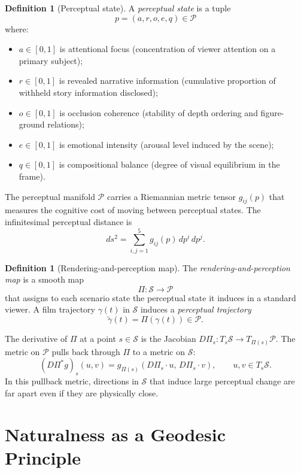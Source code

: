\documentclass[12pt,a4paper]{article}
\theoremstyle{plain}
\theoremstyle{definition}
\newtheorem{definition}[theorem]{Definition}
\begin{document}
\begin{definition}[Perceptual state]
A \emph{perceptual state} is a tuple
\[
p = (a, r, o, e, q) \in \mathcal{P}
\]
where:
\begin{itemize}[nosep]
\item $a \in [0,1]$ is attentional focus (concentration of viewer attention on a
primary subject);
\item $r \in [0,1]$ is revealed narrative information (cumulative proportion of
withheld story information disclosed);
\item $o \in [0,1]$ is occlusion coherence (stability of depth ordering and
figure-ground relations);
\item $e \in [0,1]$ is emotional intensity (arousal level induced by the scene);
\item $q \in [0,1]$ is compositional balance (degree of visual equilibrium in the
frame).
\end{itemize}
\end{definition}

The perceptual manifold $\mathcal{P}$ carries a Riemannian metric tensor
$g_{ij}(p)$ that measures the cognitive cost of moving between perceptual states.
The infinitesimal perceptual distance is
\[
ds^2 = \sum_{i,j=1}^{5} g_{ij}(p)\,dp^i\,dp^j.
\]

\begin{definition}[Rendering-and-perception map]
The \emph{rendering-and-perception map} is a smooth map
\[
\Pi: \mathcal{S} \to \mathcal{P}
\]
that assigns to each scenario state the perceptual state it induces in a
standard viewer. A film trajectory $\gamma(t)$ in $\mathcal{S}$ induces a
\emph{perceptual trajectory}
\[
\tilde\gamma(t) = \Pi(\gamma(t)) \in \mathcal{P}.
\]
\end{definition}

The derivative of $\Pi$ at a point $s \in \mathcal{S}$ is the Jacobian
$D\Pi_s: T_s\mathcal{S} \to T_{\Pi(s)}\mathcal{P}$.
The metric on $\mathcal{P}$ pulls back through $\Pi$ to a metric on $\mathcal{S}$:
\[
(D\Pi^* g)_s(u,v) = g_{\Pi(s)}(D\Pi_s\cdot u,\, D\Pi_s\cdot v),
\qquad u,v \in T_s\mathcal{S}.
\]
In this pullback metric, directions in $\mathcal{S}$ that induce large
perceptual change are far apart even if they are physically close.

\section{Naturalness as a Geodesic Principle}
\label{sec:geodesic}
\end{document}
